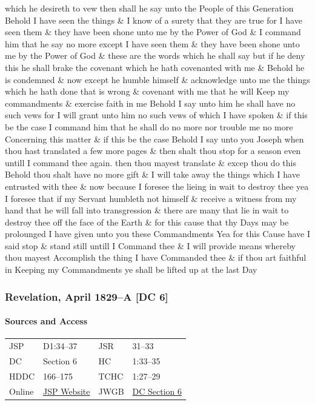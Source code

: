 which he desireth to vew then shall he say unto the People of this Generation Behold I have seen the things \& I know of a surety that they are true for I have seen them \& they have been shone unto me by the Power of God \& I command him that he say no more except I have seen them \& they have been shone unto me by the Power of God \& these are the words which he shall say but if he deny this he shall brake the covenant which he hath covenanted with me \& Behold he is condemned \& now except he humble himself \& acknowledge unto me the things which he hath done that is wrong \& covenant with me that he will Keep my commandments \& exercise faith in me Behold I say unto him he shall have no such vews for I will grant unto him no such vews of which I have spoken \& if this be the case I command him that he shall do no more nor trouble me no more Concerning this matter \& if this be the case Behold I say unto you Joseph when thou hast translated a few more pages \& then shalt thou stop for a season even untill I command thee again. then thou mayest translate \& excep thou do this Behold thou shalt have no more gift \& I will take away the things which I have entrusted with thee \& now because I foresee the lieing in wait to destroy thee yea I foresee that if my Servant humbleth not himself \& receive a witness from my hand that he will fall into transgression \& there are many that lie in wait to destroy thee off the face of the Earth \& for this cause that thy Days may be prolounged I have given unto you these Commandments Yea for this Cause have I said stop \& stand still untill I Command thee \& I will provide means whereby thou mayest Accomplish the thing I have Commanded thee \& if thou art faithful in Keeping my Commandments ye shall be lifted up at the last Day
			
		\subsubsection{Revelation, April 1829--A [DC 6]}
			\label{EMS-1828-1829-JS-APR-1829-A}
			
			\paragraph{Sources and Access}

				\begin{tabular}{p{1in}p{1.5in}p{1in}p{1.5in}}
				JSP	 	& D1:34--37		& JSR 		& 31--33	 \\  
				DC	 	& Section 6 	& HC 		& 1:33--35	 \\
				HDDC 	& 166--175 		& TCHC 		& 1:27--29	 \\
				Online  & \href{https://www.josephsmithpapers.org/paper-summary/revelation-april-1829-a-dc-6/1}{JSP Website} & 
				JWGB	& \hyperref[DC6]{DC Section 6} \\
				\end{tabular}
			
